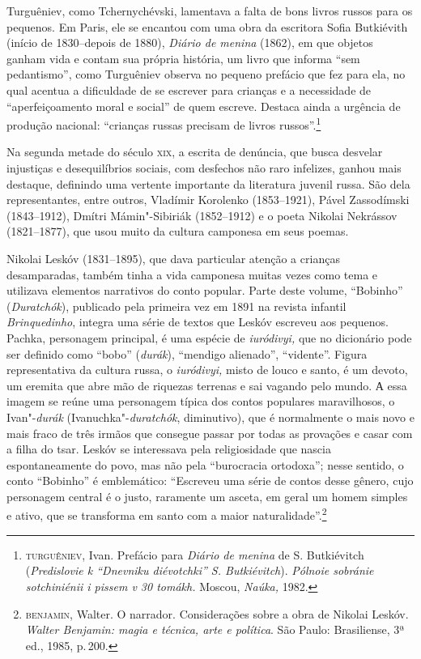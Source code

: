 Turguêniev, como Tchernychévski, lamentava a falta de bons livros russos
para os pequenos. Em Paris, ele se encantou com uma obra da escritora
Sofia Butkiévith (início de 1830--depois de 1880), \emph{Diário de
menina} (1862), em que objetos ganham vida e contam sua própria
história, um livro que informa ``sem pedantismo'', como Turguêniev
observa no pequeno prefácio que fez para ela, no qual acentua a
dificuldade de se escrever para crianças e a necessidade de
``aperfeiçoamento moral e social'' de quem escreve. Destaca ainda a
urgência de produção nacional: ``crianças russas precisam de livros
russos''.\footnote{\textsc{turguêniev}, Ivan. Prefácio para \emph{Diário de menina}
  de S. Butkiévitch (\emph{Predislovie k “Dnevniku diévotchki” S. Butkiévitch}). \emph{Pólnoie sobránie sotchiniénii i pissem v 30 tomákh.} Moscou,
  \emph{Naúka,} 1982.}

Na segunda metade do século \textsc{xix}, a escrita de denúncia, que busca
desvelar injustiças e desequilíbrios sociais, com desfechos não raro
infelizes, ganhou mais destaque, definindo uma vertente importante da
literatura juvenil russa. São dela representantes, entre outros,
Vladímir Korolenko (1853--1921), Pável Zassodímski (1843--1912), Dmítri
Mámin"-Sibiriák (1852--1912) e o poeta Nikolai Nekrássov (1821--1877),
que usou muito da cultura camponesa em seus poemas.

Nikolai Leskóv (1831--1895), que dava particular atenção a crianças desamparadas,
também tinha a vida camponesa muitas vezes como tema e utilizava
elementos narrativos do conto popular. Parte deste volume, ``Bobinho''
(\emph{Duratchók}), publicado pela primeira vez em 1891 na revista
infantil \emph{Brinquedinho}, integra uma série de textos que
Leskóv escreveu aos pequenos. Pachka, personagem principal, é uma
espécie de \emph{iuródivyi,} que no dicionário pode ser definido como
``bobo'' (\emph{durák}), ``mendigo alienado'', ``vidente''. Figura
representativa da cultura russa, o \emph{iuródivyi,} misto de louco e
santo, é um devoto, um eremita que abre mão de riquezas terrenas e sai
vagando pelo mundo. А essa imagem se reúne uma personagem típica dos
contos populares maravilhosos, o Ivan"-\emph{durák}
(Ivanuchka"-\emph{duratchók}, diminutivo), que é normalmente o mais novo e mais fraco
de três irmãos que consegue passar por todas as provações e casar com a
filha do tsar. Leskóv se interessava pela religiosidade que nascia
espontaneamente do povo, mas não pela ``burocracia ortodoxa''; nesse
sentido, o conto ``Bobinho'' é emblemático: ``Escreveu uma série de
contos desse gênero, cujo personagem central é o justo, raramente um
asceta, em geral um homem simples e ativo, que se transforma em santo
com a maior naturalidade''.\footnote{\textsc{benjamin}, Walter. O narrador.
  Considerações sobre a obra de Nikolai Leskóv. \emph{Walter Benjamin:
  magia e técnica, arte e política}. São Paulo: Brasiliense, 3ª ed.,
  1985, p.\,200.}

